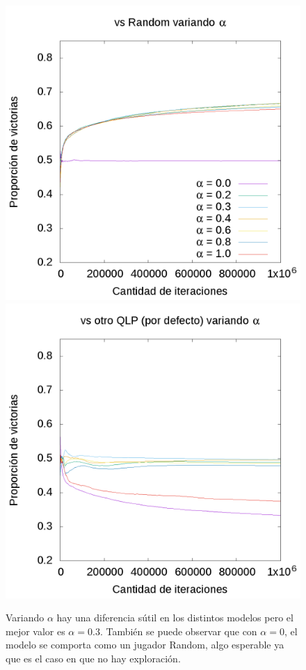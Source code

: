 \documentclass[10pt, a4paper]{article}
\begin{document}
\begin{figure}[H]
\begin{minipage}[c]{1\textwidth}
	\includegraphics[trim=230mm 185mm 13mm 90mm, clip, scale=2]{AlphaR.png}
	\includegraphics[trim=235mm 125mm 0mm 150mm, clip, scale=2]{AlphaQ.png}
	\caption{Variando $\alpha$ hay una diferencia sútil en los distintos modelos pero el mejor valor es $\alpha=0.3$. También se puede observar que con $\alpha=0$, el modelo se comporta como un jugador Random, algo esperable ya que es el caso en que no hay exploración.}
  \end{minipage}
\end{figure}
\end{document}
